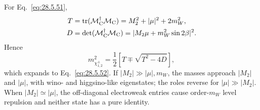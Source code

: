 \begin{enumerate}
For Eq.~\eqref{eq:28.5.51},
  \[
  \begin{aligned}
    T&=\operatorname{tr}
      (\mathcal M_{\rm C}^\dagger\mathcal M_{\rm C})
      =M_2^2+|\mu|^2+2m_W^2,\\
    D&=\det(\mathcal M_{\rm C}^\dagger\mathcal M_{\rm C})
      =|M_2\mu+m_W^2\sin2\beta|^2 .
  \end{aligned}
  \]
  Hence
  \[
    m_{\chi^\pm_{1,2}}^2
      =\frac12\left[T\mp\sqrt{T^2-4D}\right],
  \]
  which expands to Eq.~\eqref{eq:28.5.52}.  If
  \(|M_2|\gg|\mu|,m_W\), the masses approach \(|M_2|\) and
  \(|\mu|\), with wino- and higgsino-like eigenstates; the roles reverse
  for \(|\mu|\gg|M_2|\).  When \(|M_2|\simeq|\mu|\), the off-diagonal
  electroweak entries cause order-\(m_W\) level repulsion and neither
  state has a pure identity.


\end{enumerate}
